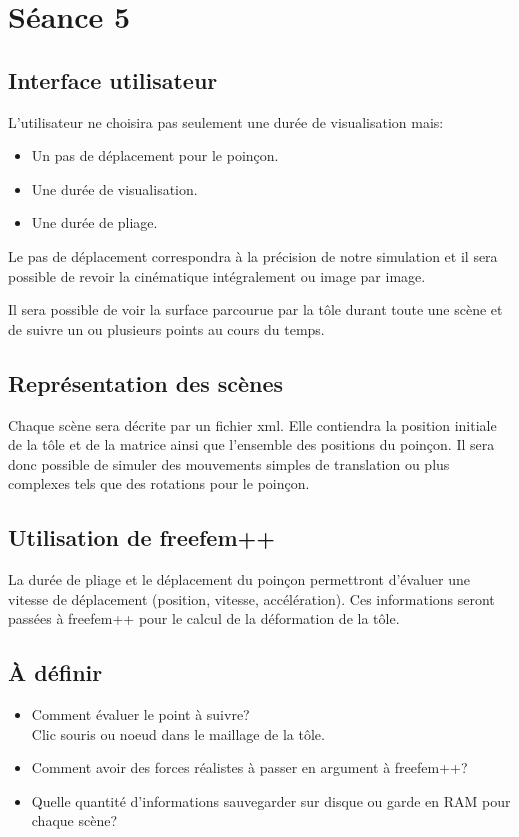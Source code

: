 \section{Séance 5}

\subsection{Interface utilisateur}
L'utilisateur ne choisira pas seulement une durée de visualisation mais:
\begin{itemize}
    \item Un pas de déplacement pour le poinçon.
    \item Une durée de visualisation.
    \item Une durée de pliage.
\end{itemize}
Le pas de déplacement correspondra à la précision de notre simulation et il sera possible de revoir la cinématique intégralement ou image par image.

Il sera possible de voir la surface parcourue par la tôle durant toute une scène et de suivre un ou plusieurs points au cours du temps.

\subsection{Représentation des scènes}
Chaque scène sera décrite par un fichier xml.
Elle contiendra la position initiale de la tôle et de la matrice ainsi que l'ensemble des positions du poinçon.
Il sera donc possible de simuler des mouvements simples de translation ou plus complexes tels que des rotations pour le poinçon.

\subsection{Utilisation de freefem++}
La durée de pliage et le déplacement du poinçon permettront d'évaluer une vitesse de déplacement (position, vitesse, accélération).
Ces informations seront passées à freefem++ pour le calcul de la déformation de la tôle.

\subsection{À définir}
\begin{itemize}
    \item Comment évaluer le point à suivre?\\
        Clic souris ou noeud dans le maillage de la tôle.
    \item Comment avoir des forces réalistes à passer en argument à freefem++?
    \item Quelle quantité d'informations sauvegarder sur disque ou garde en RAM pour chaque scène?
\end{itemize}
